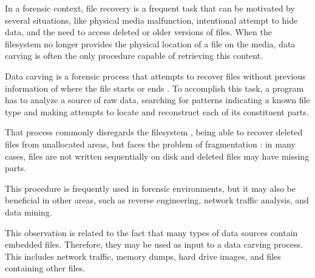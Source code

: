 In a forensic context, file recovery is a frequent task that can be motivated by several situations, like physical media malfunction, intentional attempt to hide data, and the need to access deleted or older versions of files. When the filesystem no longer provides the physical location of a file on the media, data carving is often the only procedure capable of retrieving this content.

Data carving is a forensic process that attempts to recover files without previous information of where the file starts or ends \cite{garfinkel_carving_2007}.
To accomplish this task, a program has to analyze a source of raw data, searching for patterns indicating a known file type and making attempts to locate and reconstruct each of its constituent parts.

That process commonly disregards the filesystem \cite{veenman_statistical_2007}, being able to recover deleted files from unallocated areas, but faces the problem of fragmentation \cite{veenman_statistical_2007}  \cite{pal_evolution_2009}: in many cases, files are not written sequentially on disk and deleted files may have missing parts.

This procedure is frequently used in forensic environments, but it may also be beneficial in other areas, such as reverse engineering, network traffic analysis, and data mining.

This observation is related to the fact that many types of data sources contain embedded files. Therefore, they may be used as input to a data carving process. This includes network traffic, memory dumps, hard drive images, and files containing other files.
